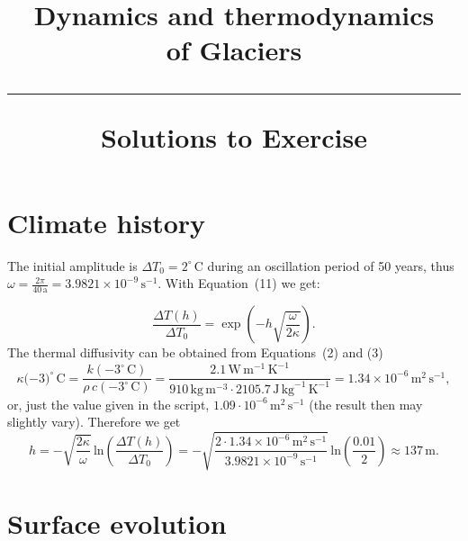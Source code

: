 \documentclass[DIV15,11pt,parskip=half]{scrartcl}
\newcommand{\unit}[1]{\ensuremath{\,\mathrm{#1}}}
\newcommand{\cels}[1]{\ensuremath{#1^{\circ}\,\mathrm{C}}}
\begin{document}
\vspace{-5em}

\title{Dynamics and thermodynamics \\ of Glaciers \\[.2em]
\rule[1em]{\textwidth}{2pt}
\LARGE{\sf Solutions to Exercise}
}
\date{}

\maketitle


\vspace{-5em}

\section{Climate history}

The initial amplitude is $\Delta T_0 = \cels{2}$ during an oscillation period of 50 years, thus $\omega = \frac{2\pi}{40\,\text{a}} = 3.9821\times 10^{-9}\,\text{s}^{-1}$. With Equation~(11) we get:

 \begin{equation*}
   \label{eq:temp-depth-amplitude}
   \frac{\Delta T(h)}{\Delta T_0}= \exp\left(-h \sqrt{\frac{\omega}{2\kappa}}\right).
 \end{equation*} The thermal diffusivity can be obtained from Equations~(2) and (3)
\begin{equation*}
\kappa(-\cels{3)} = \frac{k(-\cels{3})}{\rho\,c(-\cels{3})} = \frac{2.1\,\text{W}\,\text{m}^{-1}\,\text{K}^{-1}}{910\,\text{kg}\,\text{m}^{-3} \cdot 2105.7\,\text{J}\,\text{kg}^{-1}\,\text{K}^{-1}} = 1.34\times 10^{-6}\,\text{m}^{2}\,\text{s}^{-1}, 
\end{equation*} or, just the value given in the script, $1.09\cdot 10^{-6}\unit{m}^{2}\unit{s}^{-1}$ (the result then may slightly vary).
Therefore we get
\begin{equation*}
  h = -\sqrt{\frac{2\kappa}{\omega}}\,\text{ln}\left(\frac{\Delta T(h)}{\Delta T_0}\right)
  = - \sqrt{\frac{2\cdot 1.34\times 10^{-6}\,\text{m}^{2}\,\text{s}^{-1}}{3.9821\times 10^{-9}\,\text{s}^{-1}}}\,\text{ln}\left( \frac{0.01}{2}\right) \approx 137\,\text{m}.
\end{equation*}

\section{Surface evolution}
\end{document}

